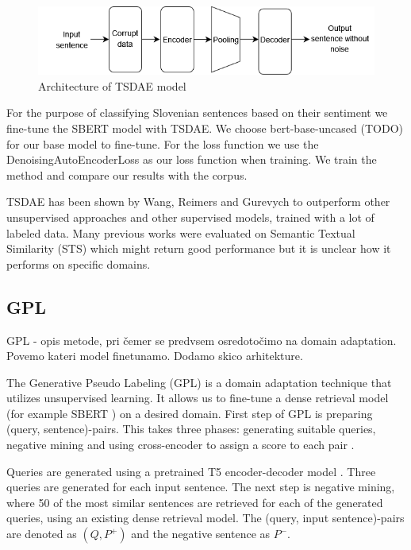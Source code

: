 \documentclass[fleqn,moreauthors,10pt]{ds_report}
\begin{document}
\begin{figure}[ht]\centering
	\includegraphics[width=\linewidth]{TSDAEdiagram.png}
	\caption{Architecture of TSDAE model}
	\label{fig:tsdae}
\end{figure}

For the purpose of classifying Slovenian sentences based on their sentiment we fine-tune the SBERT model with TSDAE. We choose bert-base-uncased (TODO) for our base model to fine-tune. For the loss function we use the DenoisingAutoEncoderLoss as our loss function when training. We train the method and compare our results with the corpus.


TSDAE has been shown by Wang, Reimers and Gurevych \cite{wang-etal-2021-tsdae-using} to outperform other unsupervised approaches and other supervised models, trained with a lot of labeled data. Many previous works were evaluated on Semantic Textual Similarity (STS) which might return good performance but it is unclear how it performs on specific domains. 


\subsection*{GPL}
GPL - opis metode, pri čemer se predvsem osredotočimo na domain adaptation. Povemo kateri model finetunamo.
Dodamo skico arhitekture.

The Generative Pseudo Labeling (GPL) is a domain adaptation technique that utilizes unsupervised learning. It allows us to fine-tune a dense retrieval model (for example SBERT \cite{SBERT}) on a desired domain. First step of GPL is preparing (query, sentence)-pairs. This takes three phases: generating suitable queries, negative mining and using cross-encoder to assign a score to each pair \cite{GPL}.

Queries are generated using a pretrained T5 encoder-decoder model \cite{T5}. Three queries are generated for each input sentence. The next step is negative mining, where 50 of the most similar sentences are retrieved for each of the generated queries, using an existing dense retrieval model. The (query, input sentence)-pairs are denoted as $(Q, P^{+})$ and the negative sentence as $P^{-}$.
\end{document}

